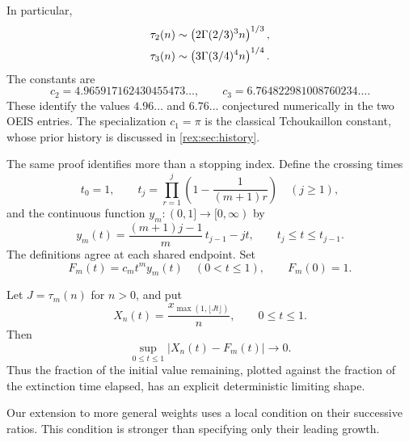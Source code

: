 In particular,
\begin{align}
 \tau_2(n)&\mathrel{\sim}
 \left(2\Gamma(2/3)^3n\right)^{1/3},\label{rex:eq:square}\\
 \tau_3(n)&\mathrel{\sim}
 \left(3\Gamma(3/4)^4n\right)^{1/4}.\label{rex:eq:cube}
\end{align}
The constants are
\begin{equation}\label{rex:eq:decimals}
 c_2=4.965917162430455473\ldots,\qquad
 c_3=6.764822981008760234\ldots.
\end{equation}
These identify the values $4.96\ldots$ and $6.76\ldots$ conjectured
numerically in the two OEIS entries. The specialization $c_1=\pi$ is the
classical Tchoukaillon constant, whose prior history is discussed in
\cref{rex:sec:history}.

The same proof identifies more than a stopping index. Define the crossing
times
\begin{equation}\label{rex:eq:crossing-def}
 t_0=1,\qquad
 t_j=\prod_{r=1}^{j}\left(1-\frac1{(m+1)r}\right)\quad(j\geq1),
\end{equation}
and the continuous function $y_m:(0,1]\to[0,\infty)$ by
\begin{equation}\label{rex:eq:profile-def}
 y_m(t)=\frac{(m+1)j-1}{m}\,t_{j-1}-jt,
 \qquad t_j\leq t\leq t_{j-1}.
\end{equation}
The definitions agree at each shared endpoint. Set
\begin{equation}\label{rex:eq:mass-profile}
 F_m(t)=c_m t^m y_m(t)\quad(0<t\leq1),\qquad F_m(0)=1.
\end{equation}

\begin{theorem}\label{rex:thm:forward-profile}
Let $J=\tau_m(n)$ for $n>0$, and put
\[
 X_n(t)=\frac{x_{\max(1,\lfloor Jt\rfloor)}}n,
 \qquad 0\leq t\leq1.
\]
Then
\begin{equation}\label{rex:eq:uniform-forward}
 \sup_{0\leq t\leq1}|X_n(t)-F_m(t)|\longrightarrow0.
\end{equation}
Thus the fraction of the initial value remaining, plotted against the
fraction of the extinction time elapsed, has an explicit deterministic
limiting shape.
\end{theorem}

Our extension to more general weights uses a local condition on their
successive ratios. This condition is stronger than specifying only their
leading growth.

